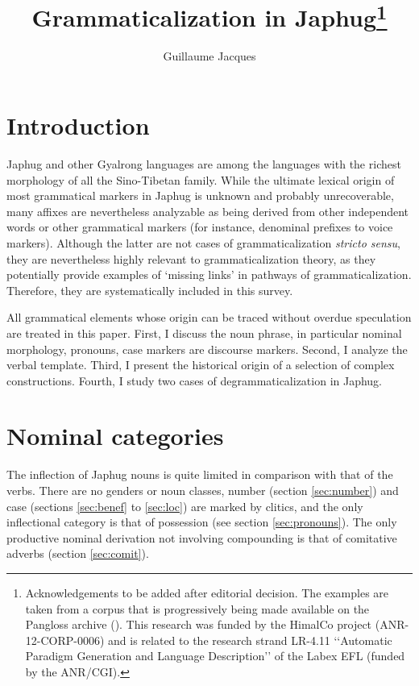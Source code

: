 \documentclass[oneside,a4paper,11pt]{article}
\begin{document}
 
 \title{Grammaticalization in Japhug\footnote{Acknowledgements to be added after editorial decision. The examples are taken from a corpus that is progressively being made available on the Pangloss archive (\citealt{michailovsky14pangloss}). This research was funded by the HimalCo project (ANR-12-CORP-0006) and is related to the research strand LR-4.11 ‘‘Automatic Paradigm Generation and Language Description’’ of the Labex EFL (funded by the ANR/CGI). }}
 \author{Guillaume Jacques}
 \maketitle  
 \section{Introduction}
Japhug and other Gyalrong languages are among the languages with the richest morphology of all the Sino-Tibetan family. While the ultimate lexical origin of most grammatical markers in Japhug is unknown and probably unrecoverable, many affixes are nevertheless analyzable as being derived from other independent words or other grammatical markers (for instance, denominal prefixes to voice markers). Although the latter are not cases of grammaticalization \textit{stricto sensu}, they are nevertheless  highly relevant to grammaticalization theory, as they potentially provide examples of `missing links' in pathways of grammaticalization. Therefore, they are systematically included in this survey.

All grammatical elements whose origin can be traced without overdue speculation are treated in this paper. First, I discuss the noun phrase, in particular nominal morphology, pronouns, case markers are discourse markers. Second, I analyze the verbal template. Third, I present the historical origin of a selection of complex constructions. Fourth, I study two cases of degrammaticalization in Japhug.

 \section{Nominal categories} 
 
The inflection of Japhug nouns is quite limited in comparison with that of the verbs. There are no genders or noun classes, number (section \ref{sec:number}) and case (sections \ref{sec:benef} to \ref{sec:loc}) are marked by clitics, and the only inflectional category is that of possession (see section \ref{sec:pronouns}).  The only productive nominal derivation not involving compounding is that of comitative adverbs (section \ref{sec:comit}).
\end{document}
